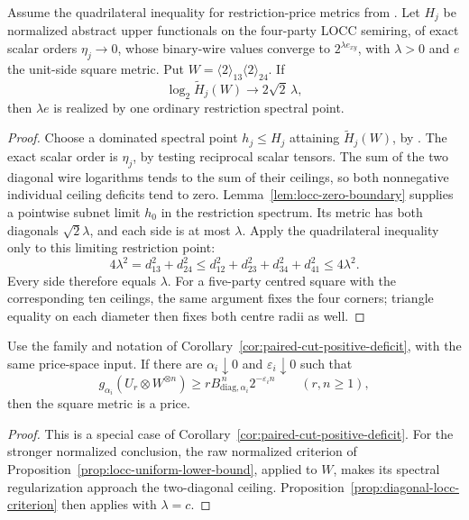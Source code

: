 \begin{proposition}\label{prop:diagonal-locc-criterion}
Assume the quadrilateral inequality for restriction-price metrics from
\cite[Proposition~C.3]{Anthropic2026}.
Let \(H_j\) be normalized abstract upper functionals on the four-party
LOCC semiring, of exact scalar orders \(\eta_j\to0\), whose binary-wire
values converge to \(2^{\lambda e_{xy}}\), with \(\lambda>0\) and \(e\)
the unit-side square metric.  Put
\(W=\langle2\rangle_{13}\langle2\rangle_{24}\).
If
\[
 \log_2\widetilde H_j(W)\longrightarrow2\sqrt2\,\lambda,
\]
then \(\lambda e\) is realized by one ordinary restriction spectral point.
\end{proposition}
\begin{proof}
Choose a dominated spectral point \(h_j\leq H_j\) attaining
\(\widetilde H_j(W)\), by \cite[Theorem~3.23]{BugarVrana2025}.
The exact scalar order is \(\eta_j\), by testing reciprocal scalar tensors.
The sum of the two diagonal wire logarithms tends to the sum of their
ceilings, so both nonnegative individual ceiling deficits tend to zero.
Lemma~\ref{lem:locc-zero-boundary} supplies a pointwise subnet limit
\(h_0\) in the restriction spectrum.  Its metric has both diagonals
\(\sqrt2\lambda\), and each side is at most \(\lambda\).
Apply the quadrilateral inequality only to this limiting restriction point:
\[
 4\lambda^2=d_{13}^2+d_{24}^2
 \leq d_{12}^2+d_{23}^2+d_{34}^2+d_{41}^2
 \leq4\lambda^2.
\]
Every side therefore equals \(\lambda\).
For a five-party centred square with the corresponding ten ceilings,
the same argument fixes the four corners; triangle equality on each
diameter then fixes both centre radii as well.
\end{proof}

\begin{corollary}\label{cor:paired-cut-square-sufficient}
Use the family and notation of
Corollary~\ref{cor:paired-cut-positive-deficit}, with the same price-space
input.
If there are \(\alpha_i\downarrow0\) and \(\varepsilon_i\downarrow0\)
such that
\[
 g_{\alpha_i}(U_r\otimes W^{\otimes n})
 \geq r B_{\mathrm{diag},\alpha_i}^{\,n}2^{-\varepsilon_i n}
 \qquad(r,n\geq1),
\]
then the square metric is a price.
\end{corollary}
\begin{proof}
This is a special case of Corollary~\ref{cor:paired-cut-positive-deficit}.
For the stronger normalized conclusion, the raw normalized criterion of
Proposition~\ref{prop:locc-uniform-lower-bound}, applied to \(W\),
makes its spectral regularization approach the two-diagonal ceiling.
Proposition~\ref{prop:diagonal-locc-criterion} then applies with
\(\lambda=c\).
\end{proof}

